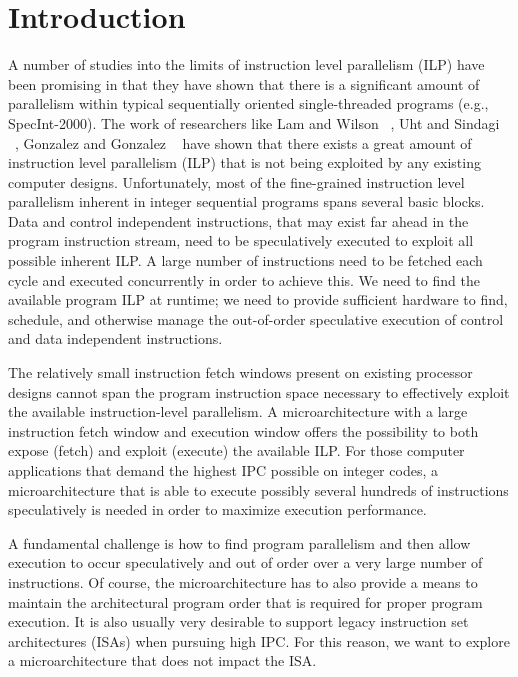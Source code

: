\documentclass[10pt,dvips]{article}
\begin{document}
\section{Introduction}
%
A number of studies into the limits of instruction level 
parallelism (ILP) have
been promising in that they have shown that there is 
a significant amount of parallelism within
typical sequentially oriented single-threaded programs
(e.g., SpecInt-2000).  
The work of researchers like
Lam and Wilson ~\cite{Lam92},
Uht and Sindagi ~\cite{Uht95},
Gonzalez and Gonzalez ~\cite{Gon97}
have shown that there exists a great amount of instruction level
parallelism (ILP) that is not being exploited by any existing
computer designs.
Unfortunately, most of the fine-grained instruction level
parallelism inherent in integer sequential programs
spans several basic blocks.  
Data and control independent instructions, that may exist
far ahead in the program instruction stream, need to be
speculatively executed to exploit all possible inherent
ILP.
A large number of instructions need to be fetched
each cycle and executed concurrently in order to achieve this.
We need to find the available program ILP at runtime; we need to 
provide sufficient hardware to find, schedule,
and otherwise manage the out-of-order speculative execution of
control and data independent instructions.

The relatively small
instruction fetch windows present on existing processor designs cannot span
the program instruction space necessary to effectively exploit the
available instruction-level parallelism.  
A microarchitecture with a large instruction fetch window and
execution window offers the possibility to both expose (fetch) and
exploit (execute) the available ILP.
For those computer applications that demand the
highest IPC possible on integer codes, a microarchitecture
that is able to execute possibly
several hundreds of instructions speculatively is needed in order to 
maximize execution performance.  

A fundamental challenge 
is how to find program parallelism and then allow execution to occur
speculatively and out of order over a very large number of instructions.
Of course, the microarchitecture has to also provide a means
to maintain the architectural program order that
is required for proper program execution.
It is also usually very desirable to support legacy instruction
set architectures (ISAs) when pursuing high IPC. 
For this reason, we want to explore a
microarchitecture that does not impact the ISA.
\end{document}
